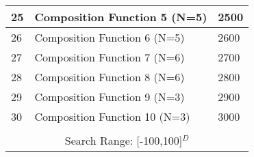 \begin{table}[!htbp]
\begin{tabular}{|p{0.5cm}|p{5.4cm}|p{0.6cm}|}
25 & Composition Function 5 (N=5) & 2500\\
\hline
26 & Composition Function 6 (N=5) & 2600\\
\hline
27 & Composition Function 7 (N=6) & 2700\\
\hline
28 & Composition Function 8 (N=6) & 2800 \\
\hline
29 & Composition Function 9 (N=3) & 2900 \\
\hline
30 & Composition Function 10 (N=3) & 3000 \\
\hline
\multicolumn{3}{|c|}{ } \\[0.05ex]
\multicolumn{3}{|c|}{Search Range: [-100,100]$^{D}$ } \\
\hline
\end{tabular}
\vspace{-1mm}
\end{table}

